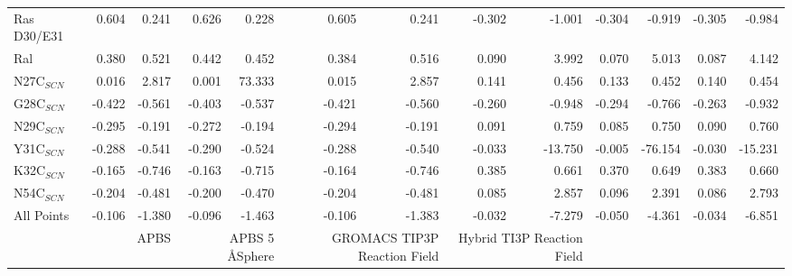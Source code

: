 \documentclass[landscape]{article}
\begin{document}
{\begin{tabular}{ l || r r | r r | r r | r r| r r | r r}
Ras D30/E31    & 0.604          & 0.241          & 0.626          & 0.228          & 0.605          & 0.241          & -0.302         & -1.001         & -0.304         & -0.919         & -0.305         & -0.984        \\
Ral            & 0.380          & 0.521          & 0.442          & 0.452          & 0.384          & 0.516          & 0.090          & 3.992          & 0.070          & 5.013          & 0.087          & 4.142         \\
\hline	
N27C$_{SCN}$   & 0.016          & 2.817          & 0.001          & 73.333         & 0.015          & 2.857          & 0.141          & 0.456          & 0.133          & 0.452          & 0.140          & 0.454         \\
G28C$_{SCN}$   & -0.422         & -0.561         & -0.403         & -0.537         & -0.421         & -0.560         & -0.260         & -0.948         & -0.294         & -0.766         & -0.263         & -0.932        \\
N29C$_{SCN}$   & -0.295         & -0.191         & -0.272         & -0.194         & -0.294         & -0.191         & 0.091          & 0.759          & 0.085          & 0.750          & 0.090          & 0.760         \\
Y31C$_{SCN}$   & -0.288         & -0.541         & -0.290         & -0.524         & -0.288         & -0.540         & -0.033         & -13.750        & -0.005         & -76.154        & -0.030         & -15.231       \\
K32C$_{SCN}$   & -0.165         & -0.746         & -0.163         & -0.715         & -0.164         & -0.746         & 0.385          & 0.661          & 0.370          & 0.649          & 0.383          & 0.660         \\
N54C$_{SCN}$   & -0.204         & -0.481         & -0.200         & -0.470         & -0.204         & -0.481         & 0.085          & 2.857          & 0.096          & 2.391          & 0.086          & 2.793         \\
\hline	
All Points     & -0.106         & -1.380         & -0.096         & -1.463         & -0.106         & -1.383         & -0.032         & -7.279         & -0.050         & -4.361         & -0.034         & -6.851        \\
 & \multicolumn{2}{|C{2cm}}{APBS} & \multicolumn{2}{|C{2cm}}{APBS 5 \AA  Sphere} & \multicolumn{2}{|C{2cm}}{GROMACS TIP3P Reaction Field} & \multicolumn{2}{|C{2cm}}{Hybrid TI3P Reaction Field} \\

\end{tabular}}
\end{document}
